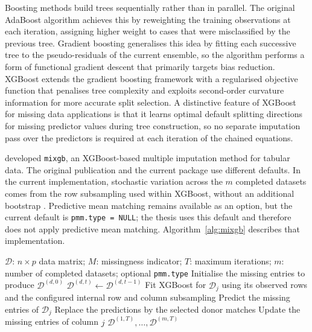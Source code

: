Boosting methods build trees sequentially rather than in parallel. The original AdaBoost algorithm \citep{freund1997decision} achieves this by reweighting the training observations at each iteration, assigning higher weight to cases that were misclassified by the previous tree. Gradient boosting \citep{friedman2001greedy} generalises this idea by fitting each successive tree to the pseudo-residuals of the current ensemble, so the algorithm performs a form of functional gradient descent that primarily targets bias reduction. XGBoost \citep{chen2016xgboost} extends the gradient boosting framework with a regularised objective function that penalises tree complexity and exploits second-order curvature information for more accurate split selection. A distinctive feature of XGBoost for missing data applications is that it learns optimal default splitting directions for missing predictor values during tree construction, so no separate imputation pass over the predictors is required at each iteration of the chained equations.

\citet{deng2024multiple} developed \texttt{mixgb}, an XGBoost-based multiple imputation method for tabular data. The original publication and the current package use different defaults. In the current implementation, stochastic variation across the $m$ completed datasets comes from the row subsampling used within XGBoost, without an additional bootstrap \citep{deng2026mixgb}. Predictive mean matching remains available as an option, but the current default is \texttt{pmm.type = NULL}; the thesis uses this default and therefore does not apply predictive mean matching. Algorithm~\ref{alg:mixgb} describes that implementation.

\begin{algorithm}[t]
\caption{Multiple imputation through XGBoost (MIXGB)}
\label{alg:mixgb}
\begin{algorithmic}[1]
    \Require $\mathcal{D}$: $n \times p$ data matrix; $M$: missingness indicator;
             $T$: maximum iterations; $m$: number of completed datasets;
             optional \texttt{pmm.type}
        \State Initialise the missing entries to produce $\mathcal{D}^{(d,0)}$
            \State $\mathcal{D}^{(d,t)} \gets \mathcal{D}^{(d,t-1)}$
                \State Fit XGBoost for $\mathcal{D}_j$ using its observed rows and the
                       configured internal row and column subsampling
                \State Predict the missing entries of $\mathcal{D}_j$
                    \State Replace the predictions by the selected donor matches
                \EndIf
                \State Update the missing entries of column $j$
            \EndFor
        \EndFor
    \EndFor
    \State \Return $\mathcal{D}^{(1,T)},\ldots,\mathcal{D}^{(m,T)}$
\end{algorithmic}
\end{algorithm}

